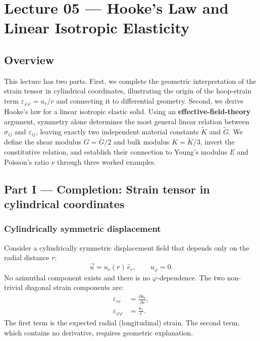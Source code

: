 

\section{Lecture 05 — Hooke's Law and Linear Isotropic Elasticity}\label{sec:lec05}
\date{April 20, 2026}

\subsection*{Overview}
This lecture has two parts. First, we complete the geometric interpretation of the strain tensor in cylindrical coordinates, illustrating the origin of the hoop-strain term $\varepsilon_{\varphi\varphi}=u_r/r$ and connecting it to differential geometry. Second, we derive Hooke's law for a linear isotropic elastic solid. Using an \textbf{effective-field-theory} argument, symmetry alone determines the most general linear relation between $\sigma_{ij}$ and $\varepsilon_{ij}$, leaving exactly two independent material constants $\tilde{K}$ and $\tilde{G}$. We define the shear modulus $G=\tilde{G}/2$ and bulk modulus $K=\tilde{K}/3$, invert the constitutive relation, and establish their connection to Young's modulus $E$ and Poisson's ratio $\nu$ through three worked examples.

\subsection*{Part I — Completion: Strain tensor in cylindrical coordinates}

\subsubsection*{Cylindrically symmetric displacement}

Consider a cylindrically symmetric displacement field that depends only on the radial distance $r$:
\[
    \vec{u} = u_r(r)\,\hat{e}_r, \qquad u_\varphi = 0.
\]
No azimuthal component exists and there is no $\varphi$-dependence. The two non-trivial diagonal strain components are:
\begin{align}
    \varepsilon_{rr} &= \frac{\partial u_r}{\partial r}, \label{eq:eps_rr}\\[4pt]
    \varepsilon_{\varphi\varphi} &= \frac{u_r}{r}. \label{eq:eps_phiphi}
\end{align}
The first term is the expected radial (longitudinal) strain. The second term, which contains no derivative, requires geometric explanation.

